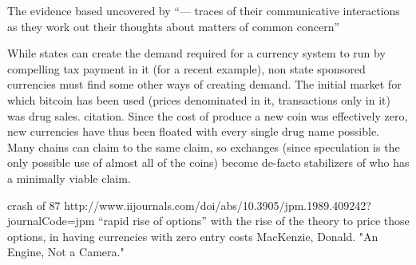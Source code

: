 The evidence based uncovered by “— traces of their communicative interactions as they work out their thoughts about matters of common concern” 

While states can create the demand required for a currency system to run by compelling tax payment in it (for a recent example), non state sponsored currencies must find some other ways of creating demand.
The initial market for which bitcoin has been used (prices denominated in it, transactions only in it) was drug sales. citation.
Since the cost of produce a new coin was effectively zero, new currencies have thus been floated with every single drug name possible. Many chains can claim to the same claim, so exchanges (since speculation is the only possible use of almost all of the coins) become de-facto stabilizers of who has a minimally viable claim. 

crash of 87 http://www.iijournals.com/doi/abs/10.3905/jpm.1989.409242?journalCode=jpm “rapid rise of options” with the rise of the theory to price those options, in having currencies with zero entry costs
MacKenzie, Donald. "An Engine, Not a Camera."







